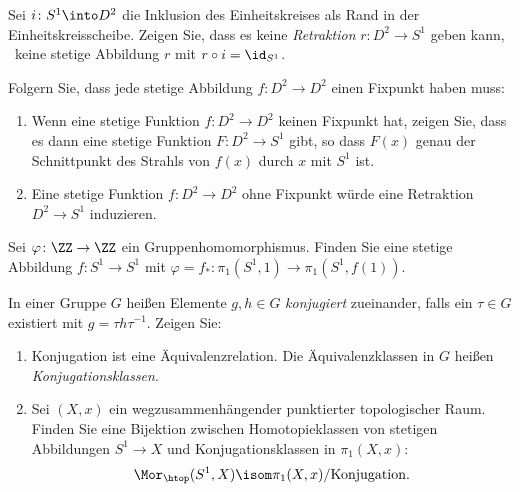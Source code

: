 

\setcounter{Sheet}{7}



\maketitle
\begin{exercise}
Sei $i\colon S^1\into D^2$ die Inklusion des Einheitskreises als Rand in
der Einheitskreisscheibe. Zeigen Sie, dass es keine \emph{Retraktion} $r\colon
D^2\to S^1$ geben kann, \ddh~keine stetige Abbildung $r$ mit $r\circ i =
\id_{S^1}$.

Folgern Sie, dass jede stetige Abbildung $f\colon D^2\to D^2$ einen Fixpunkt
haben muss:
\begin{enumerate}
\item Wenn eine stetige Funktion $f\colon D^2\to D^2$ keinen Fixpunkt hat, zeigen
Sie, dass es dann eine stetige Funktion $F\colon D^2\to S^1$ gibt, so dass
$F(x)$ genau der Schnittpunkt des Strahls von $f(x)$ durch $x$ mit $S^1$ ist.
\item Eine stetige Funktion $f\colon D^2\to D^2$ ohne Fixpunkt würde eine
Retraktion $D^2\to S^1$ induzieren.
\end{enumerate}
\end{exercise}
\begin{exercise}
Sei $\varphi\colon \ZZ\to\ZZ$ ein Gruppenhomomorphismus. Finden Sie eine stetige
Abbildung $f\colon S^1\to S^1$ mit $\varphi = f_*\colon
\pi_1(S^1,1)\to\pi_1(S^1,f(1))$.
\end{exercise}
\begin{exercise}
In einer Gruppe $G$ heißen Elemente $g,h\in G$ \emph{konjugiert} zueinander,
falls ein $\tau\in G$ existiert mit $g = \tau h \tau^{-1}$. Zeigen Sie:
\begin{enumerate}
\item Konjugation ist eine Äquivalenzrelation. Die Äquivalenzklassen in $G$
heißen \emph{Konjugationsklassen}.
\item Sei $(X,x)$ ein wegzusammenhängender punktierter topologischer
Raum. Finden Sie eine Bijektion zwischen Homotopieklassen von stetigen
Abbildungen $S^1\to X$ und Kon\-ju\-ga\-tions\-klas\-sen in $\pi_1(X, x)$:
\[
\Mor_{\htop}(S^1, X) \isom \pi_1(X,x)/{\textnormal{Konjugation}}.
\]
\end{enumerate}
\end{exercise}
\pagebreak
